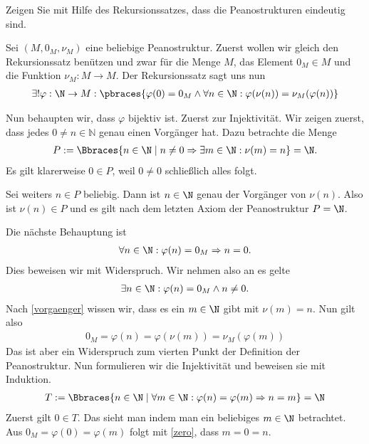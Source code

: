 \begin{exercise}
    Zeigen Sie mit Hilfe des Rekursionssatzes, dass die Peanostrukturen eindeutig sind.
\end{exercise}
\begin{solution}
    Sei $(M,0_M, \nu_M)$ eine beliebige Peanostruktur.
    Zuerst wollen wir gleich den Rekursionssatz benützen und zwar für die Menge $M$, das Element $0_M \in M$ und die Funktion $\nu_M: M \to M$. Der Rekursionssatz sagt uns nun
    \begin{align*}
        \exists! \varphi: \N \to M : \pbraces{\varphi(0) = 0_M \land \forall n \in \N : \varphi(\nu(n)) = \nu_M(\varphi(n))}
    \end{align*}

    Nun behaupten wir, dass $\varphi$ bijektiv ist. Zuerst zur Injektivität.
    Wir zeigen zuerst, dass jedes $ 0 \neq n \in \mathbb{N}$ genau einen Vorgänger hat.
    Dazu betrachte die Menge
    \begin{align}\label{vorgaenger}
       P := \Bbraces{n \in \N \mid n \neq 0 \Rightarrow \exists m \in \N: \nu(m) = n} = \N.
    \end{align}
    Es gilt klarerweise $0 \in P$, weil $0 \neq 0$ schließlich alles folgt.

    Sei weiters $n \in P$ beliebig. Dann ist $n \in \N$ genau der Vorgänger von $\nu(n)$. Also ist $\nu(n) \in P$ und es gilt nach dem letzten Axiom der Peanostruktur $P = \N$.

    Die nächste Behauptung ist
    \begin{align}\label{zero}
        \forall n \in \N: \varphi(n) = 0_M \Rightarrow n = 0.
    \end{align}
    Dies beweisen wir mit Widerspruch. Wir nehmen also an es gelte
    \begin{align*}
        \exists n \in \N: \varphi(n) = 0_M \land n \neq 0.
    \end{align*}
    Nach \eqref{vorgaenger} wissen wir, dass es ein $m \in \N$ gibt mit $\nu(m) = n$. Nun gilt also
    \begin{align*}
        0_M = \varphi(n) = \varphi(\nu(m)) = \nu_M(\varphi(m))
    \end{align*}
    Das ist aber ein Widerspruch zum vierten Punkt der Definition der Peanostruktur.
    Nun formulieren wir die Injektivität und beweisen sie mit Induktion.
    \begin{align*}
        T:= \Bbraces{n \in \N \mid \forall m \in \N: \varphi(n) = \varphi(m) \Rightarrow n = m} = \N
    \end{align*}
    Zuerst gilt $0 \in T$. Das sieht man indem man ein beliebiges $m \in \N$ betrachtet. Aus $0_M = \varphi(0) = \varphi(m)$ folgt mit \eqref{zero}, dass $m = 0 = n$.


\end{solution}
